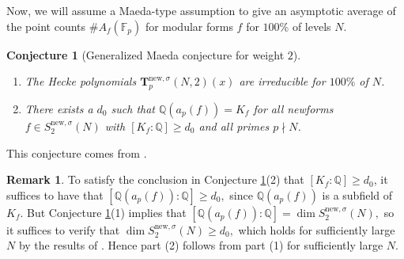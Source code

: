 \documentclass[11pt,letterpaper,reqno]{amsart}
\newtheorem{conjecture}[theorem]{Conjecture}
\theoremstyle{definition}
\newtheorem{remark}[theorem]{Remark}
\numberwithin{equation}{section}
\numberwithin{figure}{section}
\numberwithin{table}{section}
\newcommand{\nw}{\mathrm{new}}
\begin{document}

Now, we will assume a Maeda-type assumption \cite{hida1997non} to give an asymptotic average of the point counts $\#A_f(\mathbb{F}_p)$ for modular forms $f$ for $100\%$ of levels $N.$


\begin{conjecture}[Generalized Maeda conjecture for weight $2$] \label{conj:gen-Maeda}
    ~ 
    \begin{enumerate}
        \item The Hecke polynomials $\mathbf{T}_p^{\nw, \sigma}(N, 2)(x)$ are irreducible for $100\%$ of $N$.
        \item 
        There exists a $d_0$ such that 
        $\mathbb{Q} \left( a_p(f) \right) = K_{f}$ for all newforms $f \in S_2^{\nw, \sigma}(N)$
        with $[ K_{{f}} : \mathbb{Q}] \ge d_0$ and all primes $p \nmid N$.
    \end{enumerate}
\end{conjecture}
This conjecture comes from \cite[Conjecture A, Question 4]{Kimball2021}.



\begin{remark}
    To satisfy the conclusion in Conjecture \ref{conj:gen-Maeda}(2) that $[K_f:\mathbb{Q}] \ge d_0$, it suffices to have that $[\mathbb{Q}({a_p(f)}):\mathbb{Q}] \geq d_0,$ since $\mathbb{Q}({a_p(f)})$ is a subfield of $K_f.$ But Conjecture \ref{conj:gen-Maeda}(1) implies that
    $[\mathbb{Q}({a_p(f)}):\mathbb{Q}] = \dim S_2^{\mathrm{new},\sigma}(N),$
    so it suffices to verify that $\dim S_2^{\mathrm{new},\sigma}(N) \geq d_0, $ which holds for sufficiently large $N$ by the results of \cite{RVWX26}. Hence part (2) follows from part (1) for sufficiently large $N$. 
\end{remark}
\end{document}
